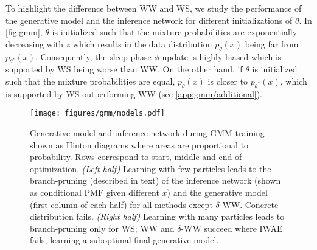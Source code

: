 To highlight the difference between \gls{WW} and \gls{WS}, we study the performance of the generative model and the inference network for different initializations of $\theta$.
In \cref{fig:gmm}, $\theta$ is initialized such that the mixture probabilities are exponentially decreasing with $z$ which results in the data distribution $p_\theta(x)$ being far from $p_{\theta^*}(x)$.
Consequently, the sleep-phase $\phi$ update is highly biased which is supported by \gls{WS} being worse than \gls{WW}.
On the other hand, if $\theta$ is initialized such that the mixture probabilities are equal, $p_\theta(x)$ is closer to $p_{\theta^*}(x)$, which is supported by \gls{WS} outperforming \gls{WW} (see \cref{app:gmm/additional}).


\begin{figure*}[!ht]
  \centering
  \texttt{[image: figures/gmm/models.pdf]}
  \vspace*{-4ex}
  \caption{
    Generative model and inference network during \gls{GMM} training shown as Hinton diagrams where areas are proportional to probability.
    Rows correspond to start, middle and end of optimization.
    \emph{(Left half)}
    Learning with few particles leads to the branch-pruning (described in text) of the inference network (shown as conditional \gls{PMF} given different $x$) and the generative model (first column of each half) for all methods except $\delta$-\gls{WW}.
    Concrete distribution fails.
    \emph{(Right half)}
    Learning with many particles leads to branch-pruning only for \gls{WS}; \gls{WW} and $\delta$-\gls{WW} succeed where \gls{IWAE} fails, learning a suboptimal final generative model.
  }
  \label{fig:gmm2}
\end{figure*}

